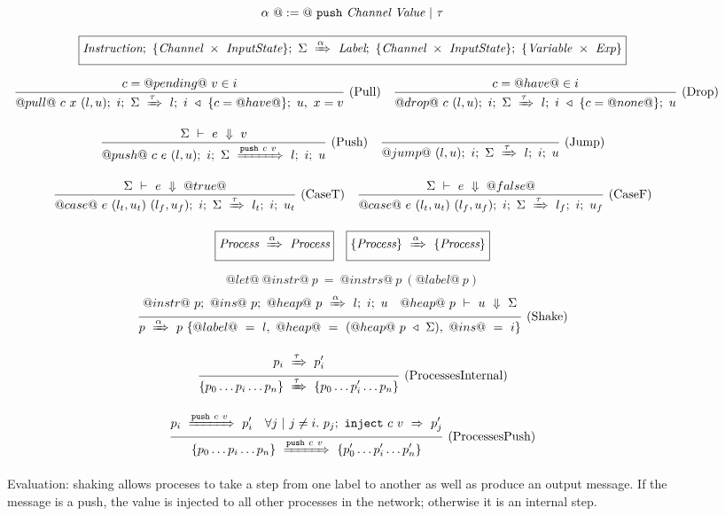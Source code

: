 \begin{figure}

$$
\alpha~@:=@~ \Push~\Chan~\Value ~|~ \tau
$$

$$
  \boxed{
    \ProcBlockShake
      {\Instr}{\MapType{\Chan}{\InputState}}{\Sigma}
      {\alpha}
      {\Label}{\MapType{\Chan}{\InputState}}{\MapType{\Var}{\Exp}}
  }
$$


$$
\ruleIN{
  c=@pending@~v \in i
}{
  \ProcBlockShake{@pull@~c~x~(l,u)}{i}{\Sigma}{\tau}{l}{\HeapUpdateOne{c}{@have@}{i}}{u,~x = v}
}{Pull}
\ruleIN{
  c=@have@ \in i
}{
  \ProcBlockShake{@drop@~c~(l,u)}{i}{\Sigma}{\tau}{l}{\HeapUpdateOne{c}{@none@}{i}}{u}
}{Drop}
$$

$$
\ruleIN{
  \ExpEval{\Sigma}{e}{v}
}{
  \ProcBlockShake{@push@~c~e~(l,u)}{i}{\Sigma}{\Push~c~v}{l}{i}{u}
}{Push}
\ruleIN{
}{
  \ProcBlockShake{@jump@~(l,u)}{i}{\Sigma}{\tau}{l}{i}{u}
}{Jump}
$$

$$
\ruleIN{
  \ExpEval{\Sigma}{e}{@true@}
}{
  \ProcBlockShake{@case@~e~(l_t,u_t)~(l_f,u_f)}{i}{\Sigma}{\tau}{l_t}{i}{u_t}
}{CaseT}
\ruleIN{
  \ExpEval{\Sigma}{e}{@false@}
}{
  \ProcBlockShake{@case@~e~(l_t,u_t)~(l_f,u_f)}{i}{\Sigma}{\tau}{l_f}{i}{u_f}
}{CaseF}
$$

$$
  \boxed{\ProcShake{\Proc}{\alpha}{\Proc}}
  \quad
  \boxed{\ProcsShake{\sgl{\Proc}}{\alpha}{\sgl{\Proc}}}
$$

$$
@let@~@instr@~p~=~@instrs@~p~(@label@~p)
$$
$$
\ruleIN{
  \ProcBlockShake
    {@instr@~p} {@ins@~p}{@heap@~p}
    {\alpha}
    {l}{i}{u}
  \quad
    \ExpEval{@heap@~p}{u}{\Sigma}
}{
  \ProcShake{p}{\alpha}{p~\sgl{@label@~=~l,~@heap@~=~(\HeapUpdates{\Sigma}{@heap@~p}),~@ins@~=~i}}
}{Shake}
$$




$$
\ruleIN{
  \ProcShake{p_i}{\tau}{p'_i}
}{
  \ProcsShake{
    \sgl{p_0 \ldots p_i \ldots p_n}
  }{\tau}{
    \sgl{p_0 \ldots p'_i \ldots p_n}
  }
}{ProcessesInternal}
$$

$$
\ruleIN{
  \ProcShake{p_i}{\Push~c~v}{p'_i}
  \quad
  \forall j~|~j \neq i.~
  \ProcInject{p_j}{c}{v}{p'_j}
}{
  \ProcsShake{
    \sgl{p_0 \ldots p_i \ldots p_n}
  }{\Push~c~v}{
    \sgl{p'_0 \ldots p'_i \ldots p'_n}
  }
}{ProcessesPush}
$$


\caption{Evaluation: shaking allows proceses to take a step from one label to another as well as produce an output message.
If the message is a push, the value is injected to all other processes in the network; otherwise it is an internal step.}
\label{fig:Process:Eval:Shake}
\end{figure}

